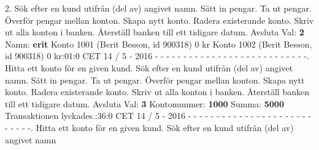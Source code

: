 \begin{multicols}{2}
2.   Sök efter en kund utifrån (del av) angivet namn.   Sätt in pengar.   Ta ut pengar.   Överför pengar mellan konton.   Skapa nytt konto.   Radera existerande konto.   Skriv ut alla konton i banken.   Återställ banken till ett tidigare datum. Avsluta\newline
Val: \textbf{2}\newline
Namn: \textbf{erit}\newline
Konto 1001 (Berit Besson, id 900318) 0 kr\newline
Konto 1002 (Berit Besson, id 900318) 0 kr:01:0 CET 14 / 5 - 2016\newline
- - - - - - - - - - - - - - - - - - - - - - - - - - -.   Hitta ett konto för en given kund.   Sök efter en kund utifrån (del av) angivet namn.   Sätt in pengar.   Ta ut pengar.   Överför pengar mellan konton.   Skapa nytt konto.   Radera existerande konto.   Skriv ut alla konton i banken.   Återställ banken till ett tidigare datum. Avsluta\newline
Val: \textbf{3}\newline
Kontonummer: \textbf{1000}\newline
Summa: \textbf{5000}\newline
Transaktionen lyckades.:36:0 CET 14 / 5 - 2016\newline
- - - - - - - - - - - - - - - - - - - - - - - - - - -.   Hitta ett konto för en given kund.   Sök efter en kund utifrån (del av) angivet namn\newline

\end{multicols}
